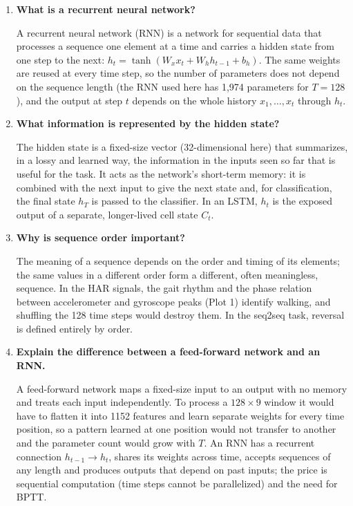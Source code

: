\documentclass[10pt]{article}
\begin{document}
\begin{enumerate}[itemsep=6pt,topsep=3pt]
\item \textbf{What is a recurrent neural network?}\par\smallskip
A recurrent neural network (RNN) is a network for sequential data that processes a sequence one element at a time and carries a hidden state from one step to the next: $h_t=\tanh(W_xx_t+W_hh_{t-1}+b_h)$. The same weights are reused at every time step, so the number of parameters does not depend on the sequence length (the RNN used here has 1,974 parameters for $T=128$), and the output at step $t$ depends on the whole history $x_1,\dots,x_t$ through $h_t$.

\item \textbf{What information is represented by the hidden state?}\par\smallskip
The hidden state is a fixed-size vector (32-dimensional here) that summarizes, in a lossy and learned way, the information in the inputs seen so far that is useful for the task. It acts as the network's short-term memory: it is combined with the next input to give the next state and, for classification, the final state $h_T$ is passed to the classifier. In an LSTM, $h_t$ is the exposed output of a separate, longer-lived cell state $C_t$.

\item \textbf{Why is sequence order important?}\par\smallskip
The meaning of a sequence depends on the order and timing of its elements; the same values in a different order form a different, often meaningless, sequence. In the HAR signals, the gait rhythm and the phase relation between accelerometer and gyroscope peaks (Plot 1) identify walking, and shuffling the 128 time steps would destroy them. In the seq2seq task, reversal is defined entirely by order.

\item \textbf{Explain the difference between a feed-forward network and an RNN.}\par\smallskip
A feed-forward network maps a fixed-size input to an output with no memory and treats each input independently. To process a $128\times9$ window it would have to flatten it into 1152 features and learn separate weights for every time position, so a pattern learned at one position would not transfer to another and the parameter count would grow with $T$. An RNN has a recurrent connection $h_{t-1}\to h_t$, shares its weights across time, accepts sequences of any length and produces outputs that depend on past inputs; the price is sequential computation (time steps cannot be parallelized) and the need for BPTT.


\end{enumerate}
\end{document}
